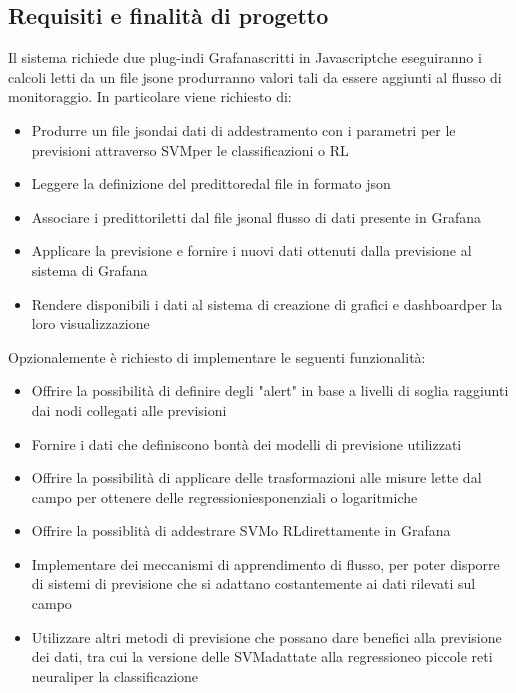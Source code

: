 \subsection{Requisiti e finalità di progetto}
Il sistema richiede due plug-in\glosp di Grafana\glosp scritti in Javascript\glosp che eseguiranno i calcoli letti da un file json\glosp e produrranno valori tali da essere aggiunti al flusso di monitoraggio. In particolare viene richiesto di:
\begin{itemize}
	\item Produrre un file json\glosp dai dati di addestramento con i parametri per le previsioni attraverso SVM\glosp per le classificazioni o RL\glo
	\item Leggere la definizione del predittore\glosp dal file in formato json\glo
	\item Associare i predittori\glosp letti dal file json\glosp al flusso di dati presente in Grafana\glo
	\item Applicare la previsione e fornire i nuovi dati ottenuti dalla previsione al sistema di Grafana\glo
	\item Rendere disponibili i dati al sistema di creazione di grafici e dashboard\glosp per la loro visualizzazione
\end{itemize}
Opzionalemente è richiesto di implementare le seguenti funzionalità:
\begin{itemize}
	\item Offrire la possibilità di definire degli "alert\glo" in base a livelli di soglia raggiunti dai nodi collegati alle previsioni
	\item Fornire i dati che definiscono bontà dei modelli di previsione utilizzati
	\item Offrire la possibilità di applicare delle trasformazioni alle misure lette dal campo per ottenere delle regressioni\glosp esponenziali o logaritmiche
	\item Offrire la possiblità di addestrare SVM\glosp o RL\glosp direttamente in Grafana\glo
	\item Implementare dei meccanismi di apprendimento di flusso, per poter disporre di sistemi di previsione che si adattano costantemente ai dati rilevati sul campo
	\item Utilizzare altri metodi di previsione che possano dare benefici alla previsione dei dati, tra cui la versione delle SVM\glosp adattate alla regressione\glosp o piccole reti neurali\glosp per la classificazione
\end{itemize}

